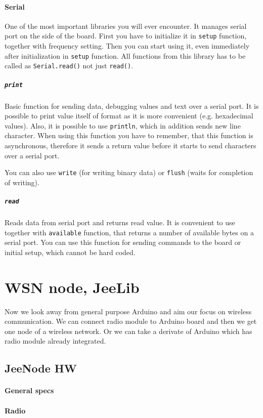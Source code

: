 \documentclass[12pt,titlepage]{article}
\begin{document}
        \paragraph{Serial}
        One of the most important libraries you will ever encounter. It manages serial port on the side of the board. First you have to initialize it in  \texttt{setup} function, together with frequency setting. Then you can start using it, even immediately after initialization in \texttt{setup} function. All functions from this library has to be called as \texttt{Serial.read()} not just \texttt{read()}.

            \subparagraph{\texttt{print}}
            Basic function for sending data, debugging values and text over a serial port. It is possible to print value itself of format as it is more convenient (e.g. hexadecimal values). Also, it is possible to use \texttt{println}, which in addition sends new line character. When using this function you have to remember, that this function is asynchronous, therefore it sends a return value before it starts to send characters over a serial port.

            You can also use \texttt{write} (for writing binary data) or \texttt{flush} (waits for completion of writing).

            \subparagraph{\texttt{read}}
          Reads data from serial port and returns read value. It is convenient to use together with \texttt{available} function, that returns a number of available bytes on a serial port. You can use this function for sending commands to the board or initial setup, which cannot be hard coded.

\section{WSN node, JeeLib}
Now we look away from general purpose Arduino and aim our focus on wireless communication. We can connect radio module to Arduino board and then we get one node of a wireless network. Or we can take a derivate of Arduino which has radio module already integrated.
    \subsection{JeeNode HW }
        \paragraph{General specs}
        \paragraph{Radio}
\end{document}
